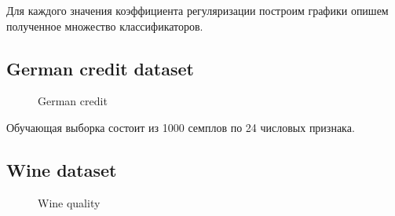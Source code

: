 \documentclass[12pt,twoside]{article}
\begin{document}
Для каждого значения коэффициента регуляризации построим графики
опишем полученное множество классификаторов.



\newpage

\subsection{German credit dataset}

\begin{figure}[H]
      \caption{German credit}
\end{figure}




Обучающая выборка состоит из 1000 семплов по 24 числовых признака. 

\newpage

\subsection{Wine dataset}


\begin{figure}[H]
      \caption{Wine quality}
\end{figure}
\end{document}
